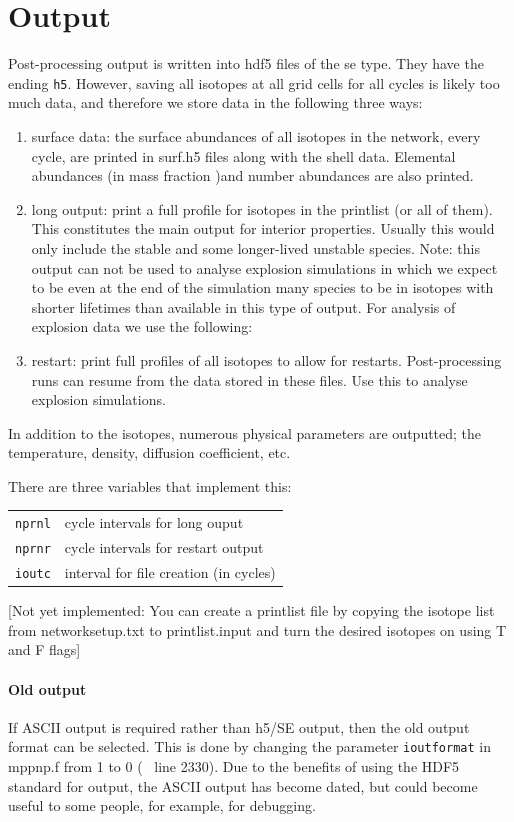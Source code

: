 \section{Output}
\label{sec:output}
Post-processing output is written into hdf5 files of the se type. They
have the ending \texttt{h5}. However, saving
all isotopes at all grid cells for all cycles is likely too much data,
and therefore we store data in the following three ways:
\begin{enumerate}
\item surface data: the surface abundances of all isotopes in the
  network, every cycle, are printed in surf.h5 files along with the shell
  data.  Elemental abundances (in mass fraction )and number abundances
  are also printed.
\item long output: print a full profile for isotopes in the printlist
  (or all of them).  This constitutes the main output for interior
  properties. Usually this would only include the stable and some
  longer-lived unstable species. Note: this output can not be used to
  analyse explosion simulations in which we expect to be even at the
  end of the simulation many species to be in isotopes with shorter
  lifetimes than available in this type of output. For analysis of
  explosion data we use the following:
\item restart: print full profiles of all isotopes to allow for restarts.
  Post-processing runs can resume from the data stored in these
  files. Use this to analyse explosion simulations.
\end{enumerate}
In addition to the isotopes, numerous physical parameters are outputted;
the temperature, density, diffusion coefficient, etc.

There are three variables that implement this:\\
\begin{tabular}{ll}
\texttt{nprnl} & cycle intervals for long ouput \\
\texttt{nprnr} & cycle intervals for restart output\\
\texttt{ioutc} & interval for file creation (in cycles)
\end{tabular}

[Not yet implemented: You can create a printlist file by copying the
isotope list from networksetup.txt to printlist.input and turn the
desired isotopes on using T and F flags]

\paragraph{Old output} If ASCII output is required rather than h5/SE
output, then the old output format can be selected.  This is done by
changing the parameter \texttt{ioutformat} in mppnp.f from 1 to 0 (~ line 2330).
Due to the benefits of using the HDF5 standard for output, the ASCII
output has become dated, but could become useful to some people, for
example, for debugging.\\

